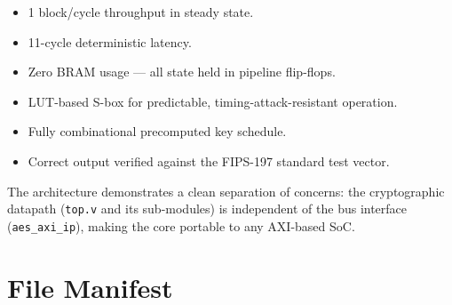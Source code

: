 \documentclass[12pt,a4paper]{article}
\begin{document}
\begin{itemize}[nosep]
  \item 1 block/cycle throughput in steady state.
  \item 11-cycle deterministic latency.
  \item Zero BRAM usage --- all state held in pipeline flip-flops.
  \item LUT-based S-box for predictable, timing-attack-resistant operation.
  \item Fully combinational precomputed key schedule.
  \item Correct output verified against the FIPS-197 standard test vector.
\end{itemize}

The architecture demonstrates a clean separation of concerns: the
cryptographic datapath (\texttt{top.v} and its sub-modules) is independent
of the bus interface (\texttt{aes\_axi\_ip}), making the core portable to
any AXI-based SoC.

\appendix
\section{File Manifest}
\end{document}
